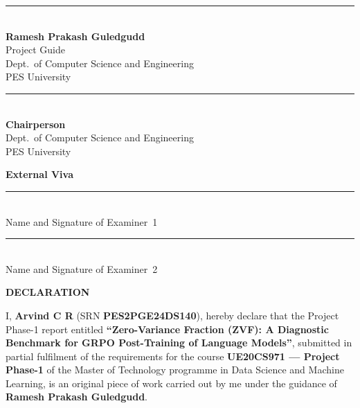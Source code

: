 \documentclass[12pt,a4paper]{report}
\begin{document}
\vspace{3.2em}

\noindent
\begin{minipage}[t]{0.48\linewidth}
\centering
\rule{5cm}{0.4pt}\\
\textbf{Ramesh Prakash Guledgudd}\\
Project Guide\\
Dept.\ of Computer Science and Engineering\\
PES University
\end{minipage}
\hfill
\begin{minipage}[t]{0.48\linewidth}
\centering
\rule{5cm}{0.4pt}\\
\textbf{Chairperson}\\
Dept.\ of Computer Science and Engineering\\
PES University
\end{minipage}

\vspace{3.0em}

\begin{center}\textbf{External Viva}\end{center}
\vspace{0.3em}
\noindent
\begin{minipage}[t]{0.48\linewidth}
\centering
\rule{5cm}{0.4pt}\\
Name and Signature of Examiner~1
\end{minipage}
\hfill
\begin{minipage}[t]{0.48\linewidth}
\centering
\rule{5cm}{0.4pt}\\
Name and Signature of Examiner~2
\end{minipage}

\clearpage
\thispagestyle{empty}
\begin{center}
{\Large\bfseries DECLARATION\par}
\end{center}
\vspace{1.0em}

I, \textbf{Arvind C R} (SRN \textbf{PES2PGE24DS140}), hereby declare that the
Project Phase-1 report entitled \textbf{``Zero-Variance Fraction (ZVF): A
Diagnostic Benchmark for GRPO Post-Training of Language Models''}, submitted in
partial fulfilment of the requirements for the course \textbf{UE20CS971 ---
Project Phase-1} of the Master of Technology programme in Data Science and Machine
Learning, is an original piece of work carried out by me under the guidance of
\textbf{Ramesh Prakash Guledgudd}.
\end{document}
